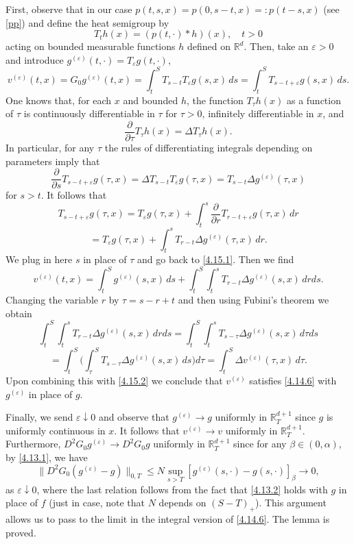 \documentclass[reqno,12pt]{amsart}
\theoremstyle{definition}
\theoremstyle{remark}
\begin{document}
First, observe that in our case $p(t,s,x)=p(0,s-t,x)=:p(t-s,x)$
   (see \eqref{pp})
and define the heat semigroup by
$$
T_{t}h(x)=(p(t,\cdot)*h)(x),\quad t>0
$$
acting   on bounded measurable   functions $h$ defined on
${\mathbb{R}}^{d}$. Then, take an $\varepsilon>0$ and introduce
$g^{(\varepsilon)}(t,\cdot) =T_{\varepsilon}g(t,\cdot)$,
\begin{equation}
                                                      \label{4.15.1}
v^{(\varepsilon)}(t,x)=G_{0}g^{(\varepsilon)}   (t,x)
=\int_{t}^{S}T_{s-t}T_{\varepsilon}g(s,x)\,ds
=\int_{t}^{S}T_{s-t+\varepsilon} g(s,x)\,ds.
\end{equation}
One knows that, for each $x$ and bounded $h$, the function
$T_{\tau} h( x)$ as a function of $\tau$ is continuously
differentiable in $\tau$ for $\tau>0$, infinitely differentiable
in $x$, and
$$
\frac{\partial}{\partial \tau}T_{\tau}h(x) =\Delta T_{\tau} h(x).
$$
In particular, for any $\tau$ the rules of differentiating
integrals depending on parameters imply that
$$
\frac{\partial}{\partial s}T_{s-t+\varepsilon} g(\tau,x) =\Delta
T_{s-t}T_{ \varepsilon} g(\tau,x) = T_{s-t}\Delta
g^{(\varepsilon)}(\tau,x)
$$
for $s>t$. It follows that
$$
T_{s-t+\varepsilon} g(\tau,x)=T_{\varepsilon}g(\tau,x)
+\int_{t}^{s}\frac{\partial}{\partial r}T_{r-t+\varepsilon}
g(\tau,x) \,dr
$$
$$
=T_{\varepsilon}g(\tau,x) +\int_{t}^{s}T_{r-t}\Delta
g^{(\varepsilon)}(\tau,x)\,dr.
$$
We plug in here $s$ in place of $\tau$ and go back to
\eqref{4.15.1}. Then we find
\begin{equation}
                                                      \label{4.15.2}
v^{(\varepsilon)}(t,x)=\int_{t}^{S} g^{(\varepsilon)}(s,x)\,ds
+\int_{t}^{S}\int_{t}^{s}T_{r-t}\Delta
g^{(\varepsilon)}(s,x)\,drds.
\end{equation}
Changing the variable $r$ by $\tau=s-r+t$ and then using Fubini's
theorem   we obtain
$$
\int_{t}^{S}\int_{t}^{s}T_{r-t}\Delta g^{(\varepsilon)}(s,x)\,drds
=\int_{t}^{S}\int_{t}^{s}T_{s-\tau}\Delta
g^{(\varepsilon)}(s,x)\,d\tau ds
$$
$$
= \int_{t}^{S} \big(\int_{\tau}^{S}T_{s-\tau} \Delta
g^{(\varepsilon)}(s,x)\,ds \big)d\tau= \int_{t}^{S}\Delta
v^{(\varepsilon)}(\tau,x)\,d\tau.
$$
Upon combining this with \eqref{4.15.2} we conclude that
$v^{(\varepsilon)}$ satisfies \eqref{4.14.6} with
$g^{(\varepsilon)}$ in place of $g$.

Finally, we send $\varepsilon\downarrow0$ and observe that
$g^{(\varepsilon)}\to g$ uniformly in ${\mathbb{R}}^{d+1}_{T}$ since $g$ is
uniformly continuous in $x$. It follows that $v^{(\varepsilon)}\to
v$ uniformly in ${\mathbb{R}}^{d+1}_{T}$. Furthermore,
   $D^{2}G_{0}g^{(\varepsilon)}\to D^{2}G_{0}g$
uniformly in ${\mathbb{R}}^{d+1}_{T}$ since for any $\beta\in(0,\alpha)$,
by \eqref{4.13.1}, we have
$$
\|D^{2}G_{0}(g^{(\varepsilon)}-g)\|_{0, T}  \leq N \sup_{s>
T}[g^{(\varepsilon)}(s,\cdot)-g(s,\cdot)]_{\beta} \to0,
$$
   as $\varepsilon\downarrow0$,  where the last
relation follows from the fact that \eqref{4.13.2} holds with $g$
in place of $f$  (just in case,
   note that $N$ depends  on
   $(S-T)_+$).
   This argument allows us to pass to the limit in the
integral version of \eqref{4.14.6}. The lemma is proved.
\end{document}
